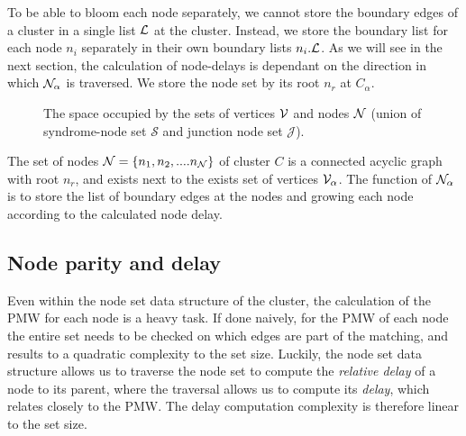To be able to bloom each node separately, we cannot store the boundary edges of a cluster in a single list $\mathcal{L}$ at the cluster. Instead, we store the boundary list for each node $n_i$ separately in their own boundary lists $n_i.\mathcal{L}$. As we will see in the next section, the calculation of node-delays is dependant on the direction in which $\mathcal{N}_\alpha$ is traversed. We store the node set by its root $n_r$ at $C_\alpha$.

\begin{figure}[h]
  \centering
  \caption{The space occupied by the sets of vertices $\mathcal{V}$ and nodes $\mathcal{N}$ (union of syndrome-node set $\mathcal{S}$ and junction node set $\mathcal{J}$).}\label{fig:sets}
\end{figure}

\begin{theorem}
  The set of nodes $\mathcal{N} = \{n_1, n_2, .... n_{\mathcal{N}}\}$ of cluster $C$ is a connected acyclic graph with root $n_r$, and exists next to the exists set of vertices $\mathcal{V}_\alpha$. The function of $\mathcal{N}_\alpha$ is to store the list of boundary edges at the nodes and growing each node according to the calculated node delay.
\end{theorem}


\subsection{Node parity and delay}\label{sec:nodedelay}

Even within the node set data structure of the cluster, the calculation of the PMW for each node is a heavy task. If done naively, for the PMW of each node the entire set needs to be checked on which edges are part of the matching, and results to a quadratic complexity to the set size. Luckily, the node set data structure allows us to traverse the node set to compute the \emph{relative delay} of a node to its parent, where the traversal allows us to compute its \emph{delay}, which relates closely to the PMW. The delay computation complexity is therefore linear to the set size.


